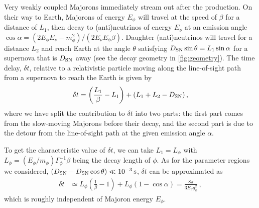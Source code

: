 \documentclass[aps,twocolumn,prl,showpacs,showkeys,preprintnumbers,superscriptaddress,nobibnotes,floatfix,longbibliography,notitlepage,nofootinbib]{revtex4-2}
\begin{document}
Very weakly coupled Majorons immediately stream out after the production.
On their way to Earth, Majorons of energy $E_\phi$ will travel at the speed of $\beta$ for a distance of $L_1$, then decay to (anti)neutrinos of energy $E_\nu$ at an emission angle $\cos\alpha = (2 E_\phi E_{\nu} - m^2_\phi)/(2E_{\nu}E_\phi\beta)$.
Daughter (anti)neutrinos will travel for a distance $L_2$ and reach Earth at the angle $\theta$ satisfying $D_{\rm SN} \sin\theta = L_1 \sin\alpha$ for a supernova that is $D_{\rm SN}$ away (see the decay geometry in \cref{fig:geometry}).
The time delay, $\delta t$, relative to a relativistic particle moving along the line-of-sight path from a supernova to reach the Earth is given by
\cite{Jaeckel:2017tud}
\begin{align}
    \delta t = \left(\frac{L_1}{\beta}-L_1\right) + (L_1 + L_2 -D_{\rm SN})\,,
    \label{eq:deltatexa}
\end{align}
where we have split the contribution to $\delta t$ into two parts: the first part comes from the slow-moving Majorons before their decay, and the second part is due to the detour from the line-of-sight path at the given emission angle $\alpha$. 

To get the characteristic value of $\delta t$, we can take $L_1 = L_\phi$ with $L_\phi = (E_\phi/m_\phi) \Gamma^{-1}_\phi \beta$ being the decay length of $\phi$.
As for the parameter regions we considered, $(D_{\rm SN} -D_{\rm SN} \cos\theta) \ll \unit[10^{-3}]{s}$, $\delta t$ can be approximated as
\begin{align}
    \delta t &\simeq L_\phi\left(\frac{1}{\beta} -1\right) + L_\phi(1-\cos\alpha) = \frac{8\pi}{3 E_{\nu}g_\phi^2}\,,
    \label{eq:deltat}
\end{align}
which is roughly independent of Majoron energy $E_\phi$.
\end{document}
